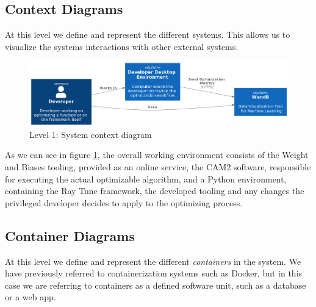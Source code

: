 
\subsection{Context Diagrams}

At this level we define and represent the different systems. This allows us to visualize the systems interactions with other external systems.

\begin{figure}[H]
\centering
\includegraphics[width=\textwidth]{images/c1_new.png}
\caption{Level 1: System context diagram}
\label{fig:level1}
\end{figure}

As we can see in figure \ref{fig:level1}, the overall working environment consists of the Weight and Biases tooling, provided as an online service, the CAM2 software, responsible for executing the actual optimizable algorithm, and a Python environment, containing the Ray Tune framework, the developed tooling and any changes the privileged developer decides to apply to the optimizing process.

\subsection{Container Diagrams}

At this level we define and represent the different \textit{containers} in the system. We have previously referred to containerization systems such as Docker, but in this case we are referring to containers as a defined software unit, such as a database or a web app.


